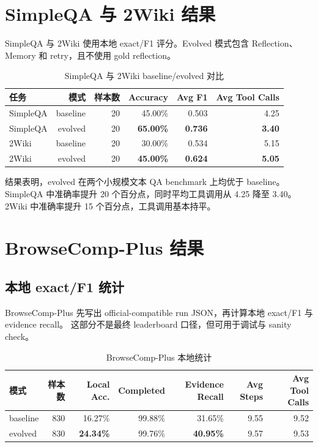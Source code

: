 \documentclass[UTF8,a4paper,11pt]{ctexart}
\begin{document}
\section{SimpleQA 与 2Wiki 结果}

SimpleQA 与 2Wiki 使用本地 exact/F1 评分。Evolved 模式包含 Reflection、Memory 和 retry，且不使用 gold reflection。

\begin{table}[h]
\centering
\begin{tabular}{lrrrrr}
\toprule
任务 & 模式 & 样本数 & Accuracy & Avg F1 & Avg Tool Calls \\
\midrule
SimpleQA & baseline & 20 & 45.00\% & 0.503 & 4.25 \\
SimpleQA & evolved & 20 & \textbf{65.00\%} & \textbf{0.736} & \textbf{3.40} \\
2Wiki & baseline & 20 & 30.00\% & 0.534 & 5.15 \\
2Wiki & evolved & 20 & \textbf{45.00\%} & \textbf{0.624} & \textbf{5.05} \\
\bottomrule
\end{tabular}
\caption{SimpleQA 与 2Wiki baseline/evolved 对比}
\end{table}

结果表明，evolved 在两个小规模文本 QA benchmark 上均优于 baseline。
SimpleQA 中准确率提升 20 个百分点，同时平均工具调用从 4.25 降至 3.40。
2Wiki 中准确率提升 15 个百分点，工具调用基本持平。

\section{BrowseComp-Plus 结果}

\subsection{本地 exact/F1 统计}

BrowseComp-Plus 先写出 official-compatible run JSON，再计算本地 exact/F1 与 evidence recall。
这部分不是最终 leaderboard 口径，但可用于调试与 sanity check。

\begin{table}[h]
\centering
\begin{tabular}{lrrrrrr}
\toprule
模式 & 样本数 & Local Acc. & Completed & Evidence Recall & Avg Steps & Avg Tool Calls \\
\midrule
baseline & 830 & 16.27\% & 99.88\% & 31.65\% & 9.55 & 9.52 \\
evolved & 830 & \textbf{24.34\%} & 99.76\% & \textbf{40.95\%} & 9.57 & 9.53 \\
\bottomrule
\end{tabular}
\caption{BrowseComp-Plus 本地统计}
\end{table}
\end{document}
